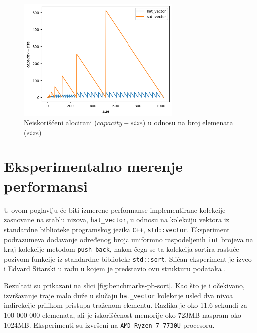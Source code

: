 \documentclass[a4paper]{article}
\begin{document}
\begin{figure}[h!]
    \centering
    \includegraphics[width=0.70\textwidth]{ilustracije/cap-size-razlika.png}
    \caption{Neiskorišćeni alocirani ($capacity - size$) u odnosu na broj elemenata ($size$)}
    \label{fig:cap-size-razlika}
\end{figure}

\section{Eksperimentalno merenje performansi}

U ovom poglavlju će biti izmerene performanse implementirane kolekcije zasnovane na stablu nizova, \verb|hat_vector|, u odnosu na kolekciju vektora iz standardne biblioteke programskog jezika \verb|C++|, \verb|std::vector|. Eksperiment podrazumeva dodavanje određenog broja uniformno raspodeljenih \verb|int| brojeva na kraj kolekcije metodom \verb|push_back|, nakon čega se ta kolekcija sortira rastuće pozivom funkcije iz standardne biblioteke \verb|std::sort|. Sličan eksperiment je izveo i Edvard Sitarski u radu u kojem je predstavio ovu strukturu podataka \cite{hat-sitarski}.

Rezultati su prikazani na slici \ref{fig:benchmarks-pb-sort}. Kao što je i očekivano, izvršavanje traje malo duže u slučaju \verb|hat_vector| kolekcije usled dva nivoa indirekcije prilikom pristupa traženom elementu. Razlika je oko 11.6 sekundi za 100 000 000 elemenata, ali je iskorišćenost memorije oko 723MB naspram oko 1024MB. Eksperimenti su izvršeni na \verb|AMD Ryzen 7 7730U| procesoru.
\end{document}
